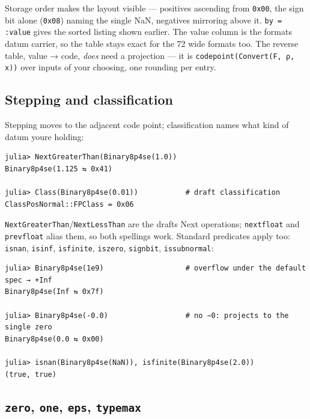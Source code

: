 Storage order makes the layout visible — positives ascending from \texttt{0x00}, the sign bit alone (\texttt{0x08}) naming the single NaN, negatives mirroring above it. \texttt{by = :value} gives the sorted listing shown earlier. The value column is the format{\textquotesingle}s datum carrier, so the table stays exact for the 72 wide formats too. The reverse table, value → code, \emph{does} need a projection — it is \texttt{codepoint(\allowbreak{}Convert(\allowbreak{}F, ρ, x))} over inputs of your choosing, one rounding per entry.



\subsection{Stepping and classification}



\label{15274975594442253874}{}


Stepping moves to the adjacent code point; classification names what kind of datum you{\textquotesingle}re holding:




\nopagebreak[4]
\begin{verbatim}
julia> NextGreaterThan(Binary8p4se(1.0))
Binary8p4se(1.125 ⇆ 0x41)

julia> Class(Binary8p4se(0.01))           # draft classification
ClassPosNormal::FPClass = 0x06
\end{verbatim}



\texttt{NextGreaterThan}/\allowbreak\texttt{NextLessThan} are the draft{\textquotesingle}s Next operations; \texttt{nextfloat} and \texttt{prevfloat} alias them, so both spellings work. Standard predicates apply too: \texttt{isnan}, \texttt{isinf}, \texttt{isfinite}, \texttt{iszero}, \texttt{signbit}, \texttt{issubnormal}:




\nopagebreak[4]
\begin{verbatim}
julia> Binary8p4se(1e9)                   # overflow under the default spec → +Inf
Binary8p4se(Inf ⇆ 0x7f)

julia> Binary8p4se(-0.0)                  # no −0: projects to the single zero
Binary8p4se(0.0 ⇆ 0x00)

julia> isnan(Binary8p4se(NaN)), isfinite(Binary8p4se(2.0))
(true, true)
\end{verbatim}



\subsection{\texttt{zero}, \texttt{one}, \texttt{eps}, \texttt{typemax}}



